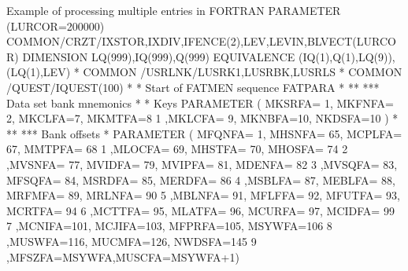 \begin{XMPt}{Example of processing multiple entries in FORTRAN}
      PARAMETER (LURCOR=200000)                                         
      COMMON/CRZT/IXSTOR,IXDIV,IFENCE(2),LEV,LEVIN,BLVECT(LURCOR)       
      DIMENSION    LQ(999),IQ(999),Q(999)                               
      EQUIVALENCE (IQ(1),Q(1),LQ(9)),(LQ(1),LEV)                        
*                                                                       
      COMMON /USRLNK/LUSRK1,LUSRBK,LUSRLS                               
*                                                                       
      COMMON /QUEST/IQUEST(100)                                         
*                                                                       
* Start of FATMEN sequence FATPARA                                      
*                                                                       
** ***     Data set bank mnemonics                                      
*                                                                       
*          Keys                                                         
      PARAMETER ( MKSRFA= 1, MKFNFA= 2, MKCLFA=7, MKMTFA=8              
     1           ,MKLCFA= 9, MKNBFA=10, NKDSFA=10 )                     
*                                                                       
** ***     Bank offsets                                                 
*                                                                       
      PARAMETER ( MFQNFA=  1, MHSNFA= 65, MCPLFA= 67, MMTPFA= 68        
     1           ,MLOCFA= 69, MHSTFA= 70, MHOSFA= 74                    
     2           ,MVSNFA= 77, MVIDFA= 79, MVIPFA= 81, MDENFA= 82        
     3           ,MVSQFA= 83, MFSQFA= 84, MSRDFA= 85, MERDFA= 86        
     4           ,MSBLFA= 87, MEBLFA= 88, MRFMFA= 89, MRLNFA= 90        
     5           ,MBLNFA= 91, MFLFFA= 92, MFUTFA= 93, MCRTFA= 94        
     6           ,MCTTFA= 95, MLATFA= 96, MCURFA= 97, MCIDFA= 99        
     7           ,MCNIFA=101, MCJIFA=103, MFPRFA=105, MSYWFA=106        
     8           ,MUSWFA=116, MUCMFA=126, NWDSFA=145                    
     9           ,MFSZFA=MSYWFA,MUSCFA=MSYWFA+1)                        
                                                                        

\end{XMPt}

